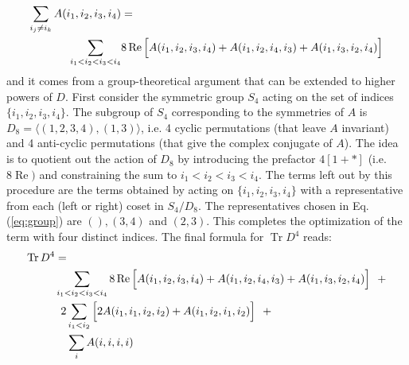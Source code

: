 \documentclass[12pt,a4paper]{article}
\DeclareMathOperator{\Tr}{Tr}
\DeclareMathOperator{\Real}{Re}
\begin{document}
\begin{align}\label{eq:group}
\sum_{i_j \neq i_k} A(i_1, i_2, i_3, i_4) &= \notag \\
 \sum_{i_1 < i_2 < i_3 < i_4} &8 \Real \Big[ A(i_1, i_2, i_3, i_4) + A(i_1, i_2, i_4, i_3) + A(i_1, i_3, i_2, i_4) \Big]
\end{align}
and it comes from a group-theoretical argument that can be extended to higher powers of $D$. First consider the symmetric group $S_4$ acting on the set of indices $\{i_1, i_2, i_3, i_4\}$. The subgroup of $S_4$ corresponding to the symmetries of $A$ is $D_8 = \langle (1, 2, 3, 4), (1, 3) \rangle$, i.e. 4 cyclic permutations (that leave $A$ invariant) and 4 anti-cyclic permutations (that give the complex conjugate of $A$). The idea is to quotient out the action of $D_8$ by introducing the prefactor $4[1+*]$ (i.e. $8 \Real)$ and constraining the sum to $i_1 < i_2 < i_3 < i_4$. The terms left out by this procedure are the terms obtained by acting on $\{i_1, i_2, i_3, i_4\}$ with a representative from each (left or right) coset in $S_4/D_8$. The representatives chosen in Eq.(\ref{eq:group}) are $(), (3,4)$ and $(2,3)$. This completes the optimization of the term with four distinct indices. \newline
The final formula for $\Tr D^4$ reads:
\begin{align}\label{eq:trd4final}
\Tr D^4 &= \notag \\
&\sum_{i_1 < i_2 < i_3 < i_4} 8 \Real \Big[ A(i_1, i_2, i_3, i_4) + A(i_1, i_2, i_4, i_3) + A(i_1, i_3, i_2, i_4) \Big] \ \ + \notag \\
&\phantom{a}2\sum_{i_1 < i_2} \Big[ 2A(i_1, i_1, i_2, i_2) + A(i_1, i_2, i_1, i_2) \Big] \ \ + \notag \\
&\phantom{aa}\sum_{i} A(i,i,i,i)
\end{align}
\end{document}
